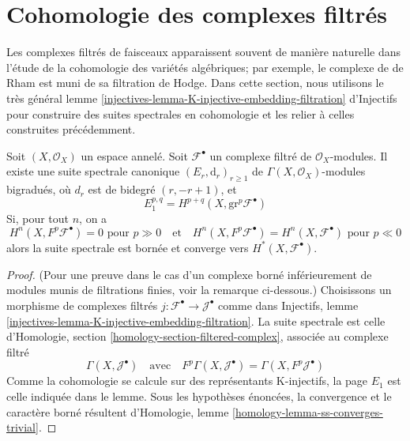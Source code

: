 {\section{Cohomologie des complexes filtrés}

\label{section-cohomology-filtered-object}

\noindent
Les complexes filtrés de faisceaux apparaissent souvent de manière naturelle dans l'étude de la cohomologie des variétés algébriques; par exemple, le complexe de de Rham est muni de sa filtration de Hodge. Dans cette section, nous utilisons le très général lemme \ref{injectives-lemma-K-injective-embedding-filtration} d'Injectifs pour construire des suites spectrales en cohomologie et les relier à celles construites précédemment.

\begin{lemma}

\label{lemma-spectral-sequence-filtered-object}

Soit $(X, \mathcal{O}_X)$ un espace annelé. Soit $\mathcal{F}^\bullet$ un complexe filtré de $\mathcal{O}_X$-modules. Il existe une suite spectrale canonique $(E_r, \text{d}_r)_{r \geq 1}$ de
$\Gamma(X, \mathcal{O}_X)$-modules bigradués, où $d_r$ est de bidegré $(r, -r + 1)$, et
$$
E_1^{p, q} = H^{p + q}(X, \text{gr}^p\mathcal{F}^\bullet)
$$
Si, pour tout $n$, on a
$$
H^n(X, F^p\mathcal{F}^\bullet) = 0\text{ pour }p \gg 0
\quad\text{et}\quad
H^n(X, F^p\mathcal{F}^\bullet) = H^n(X, \mathcal{F}^\bullet)\text{ pour }p \ll 0
$$
alors la suite spectrale est bornée et converge vers
$H^*(X, \mathcal{F}^\bullet)$.

\end{lemma}

\begin{proof}
(Pour une preuve dans le cas d'un complexe borné inférieurement de modules munis de filtrations finies, voir la remarque ci-dessous.) Choisissons un morphisme de complexes filtrés $j : \mathcal{F}^\bullet \to \mathcal{J}^\bullet$ comme dans Injectifs, lemme \ref{injectives-lemma-K-injective-embedding-filtration}. La suite spectrale est celle d'Homologie, section \ref{homology-section-filtered-complex}, associée au complexe filtré $$
\Gamma(X, \mathcal{J}^\bullet)
\quad\text{avec}\quad
F^p\Gamma(X, \mathcal{J}^\bullet) = \Gamma(X, F^p\mathcal{J}^\bullet)
$$ Comme la cohomologie se calcule sur des représentants K-injectifs, la page $E_1$ est celle indiquée dans le lemme. Sous les hypothèses énoncées, la convergence et le caractère borné résultent d'Homologie, lemme \ref{homology-lemma-ss-converges-trivial}.
\end{proof}

}
